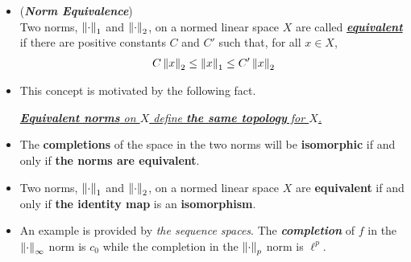 \documentclass[11pt]{article}
\begin{document}
\begin{itemize}
\item \begin{definition} (\emph{\textbf{Norm Equivalence}})\\
Two norms, $\left\|\cdot\right\|_{1}$ and $\left\|\cdot\right\|_{2}$, on a normed linear space $X$ are called \underline{\emph{\textbf{equivalent}}} if there are positive constants $C$ and $C'$ such that, for all $x \in X$,
\begin{align*}
C\left\|x\right\|_{2} \le \left\|x\right\|_{1} \le C'\left\|x\right\|_{2}
\end{align*}
\end{definition}

\item \begin{remark}
This concept is motivated by the following fact. 

\underline{\emph{\textbf{Equivalent norms} on $X$ define \textbf{the same topology} for $X$.}}
\end{remark}

\item \begin{proposition}
The \textbf{completions} of the space in the two norms will be \textbf{isomorphic} if and only if \textbf{the norms are equivalent}.
\end{proposition}



\item \begin{proposition}
Two norms, $\left\|\cdot\right\|_{1}$ and $\left\|\cdot\right\|_{2}$, on a normed linear space $X$ are \textbf{equivalent} if and only if \textbf{the identity map} is an \textbf{isomorphism}.
\end{proposition}

\item \begin{remark}
An example is provided by \emph{the sequence spaces}. The \emph{\textbf{completion}} of $f$ in the $\left\|\cdot\right\|_{\infty}$ norm is $c_{0}$  while the completion in
the $\left\|\cdot\right\|_{p}$ norm is $\ell^{p}$.
\end{remark}
\end{itemize}
\end{document}
